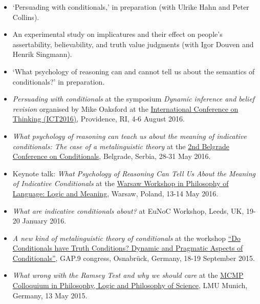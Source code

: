 \documentclass[a4paper,12pt]{article}
\begin{document}
\begin{small}
\begin{itemize}
   \item `Persuading with conditionals,' in preparation (with Ulrike Hahn and Peter Collins).
   \item An experimental study on implicatures and their effect on people's assertability, believability, and truth value judgments (with Igor Douven and Henrik Singmann).
   \item `What psychology of reasoning can and cannot tell us about the semantics of conditionals?' in preparation.  
  \end{itemize}
  

  \begin{itemize} 
  	\item \emph{Persuading with conditionals} at the symposium \emph{Dynamic inference and belief revision}  organised by Mike Oaksford at the \href{http://sites.clps.brown.edu/ict2016/}{International Conference on Thinking (ICT2016)}, Providence, RI, 4-6 August 2016. 


    \item \emph{What psychology of reasoning can teach us about the meaning of indicative conditionals: The case of a metalinguistic theory} at the \href{http://www.f.bg.ac.rs/fil-konf/konferencija2-home.html}{2nd Belgrade Conference on Conditionals}, Belgrade, Serbia, 28-31  May 2016.

    \item Keynote talk: \emph{What Psychology of Reasoning Can Tell Us About the Meaning of Indicative Conditionals} at the \href{http://logicalconnectives.uw.edu.pl/}{Warsaw Workshop in Philosophy of Language: Logic and Meaning}, Warsaw, Poland, 13-14 May 2016.

    \item \emph{What are indicative conditionals about?} at EuNoC Workshop, Leeds, UK, 19-20 January 2016.

    \item \emph{A new kind of metalinguistic theory of conditionals} at the workshop \href{http://cms.uni-konstanz.de/what-if/events/workshop-in-osnabrueck-september-2015-p1-and-p7/}{``Do Conditionals have Truth Conditions? Dynamic and Pragmatic Aspects of Conditionals''}, GAP.9 congress, Osnabrück, Germany, 18-19 September 2015.

    \item \emph{What wrong with the Ramsey Test and why we should care} at the \href{http://www.mcmp.philosophie.uni-muenchen.de/events/weekly_talks_new/index.html}{MCMP Colloquium in Philosophy, Logic and Philosophy of Science}, LMU Munich, Germany, 13 May 2015.


\end{itemize}
\end{small}
\end{document}
